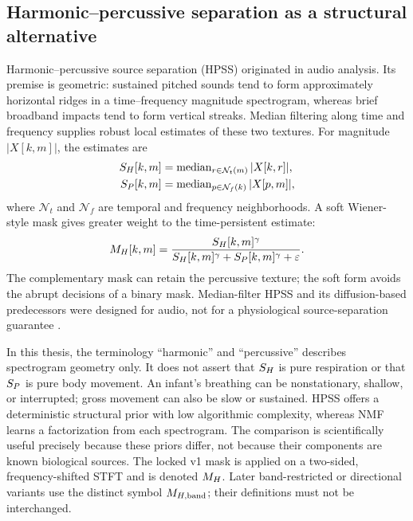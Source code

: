 \subsection{Harmonic--percussive separation as a structural alternative}

Harmonic--percussive source separation (HPSS) originated in audio analysis. Its premise is
geometric: sustained pitched sounds tend to form approximately horizontal ridges in a
time--frequency magnitude spectrogram, whereas brief broadband impacts tend to form vertical
streaks. Median filtering along time and frequency supplies robust local estimates of these two
textures. For magnitude $|X[k,m]|$, the estimates are
\begin{align}
  S_H[k,m] &= \operatorname{median}_{r\in\mathcal{N}_t(m)}|X[k,r]|,\\
  S_P[k,m] &= \operatorname{median}_{p\in\mathcal{N}_f(k)}|X[p,m]|,
  \label{eq:ch2_hpss_medians}
\end{align}
where $\mathcal{N}_t$ and $\mathcal{N}_f$ are temporal and frequency neighborhoods. A soft
Wiener-style mask gives greater weight to the time-persistent estimate:
\begin{equation}
  M_H[k,m]=
  \frac{S_H[k,m]^{\gamma}}
  {S_H[k,m]^{\gamma}+S_P[k,m]^{\gamma}+\varepsilon}.
  \label{eq:ch2_hpss_mask}
\end{equation}
The complementary mask can retain the percussive texture; the soft form avoids the abrupt decisions
of a binary mask. Median-filter HPSS and its diffusion-based predecessors were designed for audio,
not for a physiological source-separation guarantee \citep{ono2008separation,fitzgerald2010harmonic,muller2021fundamentals}.

In this thesis, the terminology ``harmonic'' and ``percussive'' describes spectrogram geometry only.
It does not assert that $S_H$ is pure respiration or that $S_P$ is pure body movement.
An infant's breathing can be nonstationary, shallow, or interrupted; gross movement can also be
slow or sustained. HPSS offers a deterministic structural prior with low algorithmic complexity,
whereas NMF learns a factorization from each spectrogram. The comparison is scientifically useful
precisely because these priors differ, not because their components are known biological sources.
The locked v1 mask is applied on a two-sided, frequency-shifted STFT and is denoted $M_H$.
Later band-restricted or directional variants use the distinct symbol $M_{H,\mathrm{band}}$; their
definitions must not be interchanged.

